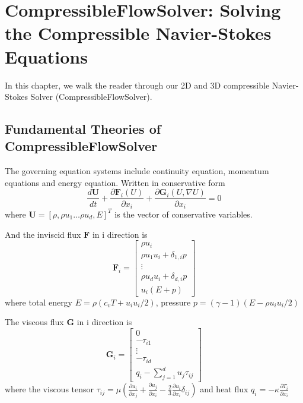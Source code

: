 \chapter{CompressibleFlowSolver: Solving the Compressible Navier-Stokes Equations}

In this chapter, we walk the reader through our 2D and 3D compressible Navier-Stokes Solver (CompressibleFlowSolver). 
\section{Fundamental Theories of CompressibleFlowSolver}
The governing equation systems include continuity equation, momentum equations and energy equation. Written in conservative form 
\begin{equation}\label{eq1}
  \frac{d \textbf{U}}{d t}+
  \frac{\partial \textbf{F}_{i}(U)}{\partial x_{i}}+
  \frac{\partial \textbf{G}_{i}(U,\nabla U)}{\partial x_{i}}
  =0
\end{equation}
where $\textbf{U}=[\rho,\rho u_{1} \hdots \rho u_{d},E]^{T}$ is the vector of conservative variables.

And the inviscid flux $\textbf{F}$ in i direction is
\begin{equation}
  \textbf{F}_{i}=
\begin{bmatrix}
  \rho u_{i}\\
  \rho u_{1}u_{i}+\delta_{1,i}p\\
  \vdots\\
  \rho u_{d}u_{i}+\delta_{d,i}p\\
  u_{i}(E+p)
\end{bmatrix}
\end{equation}
where total energy $E=\rho (c_{v}T+u_{i}u_{i}/2)$, pressure $p=(\gamma-1)(E-\rho u_{i}u_{i}/2)$

The viscous flux $\textbf{G}$ in i direction is
\begin{equation}\label{eq7}
  \textbf{G}_{i}=
\begin{bmatrix}
  0\\
  -\tau_{i1}\\
  \vdots\\
  -\tau_{id}\\
  q_{i}-\sum\limits_{j=1}^{d}{u_{j}\tau_{ij}}
\end{bmatrix}
\end{equation}
where the viscous tensor $\tau_{ij}=\mu(\frac{\partial u_{i}}{\partial x_{j}}+\frac{\partial u_{j}}{\partial x_{i}}-\frac{2}{3}\frac{\partial u_{i}}{\partial x_{i}}\delta_{ij})$ and heat flux $q_{i}=-\kappa \frac{\partial T_{i}}{\partial x_{i}}$

